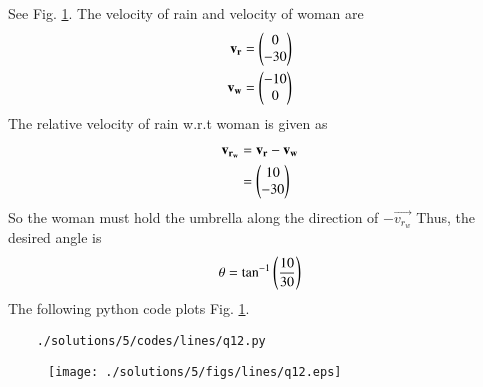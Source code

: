 See Fig. \ref{fig:3.8.5_qtwelve}.	
The velocity of rain and velocity of woman are
\begin{align}
\mathbf{v_r} &= \begin{pmatrix}0\\-30\end{pmatrix}
\\
\mathbf{v_w} &= \begin{pmatrix}-10\\0\end{pmatrix}
\end{align}
The relative velocity of rain w.r.t woman is given as
\begin{align}
\mathbf{v_{r_w}} &=\mathbf{v_r}- \mathbf{v_w}
\\
&=\begin{pmatrix}10\\-30\end{pmatrix}
\end{align}
So the woman must hold the umbrella along the direction of $-\vec{v_{r_w}}$
Thus, the desired angle is 
\begin{align}
\theta={\tan}^{-1}\left(\frac{10}{30}\right)
\end{align}
%
The following python code plots  Fig. \ref{fig:3.8.5_qtwelve}.
	\begin{lstlisting}
	./solutions/5/codes/lines/q12.py
	\end{lstlisting}
\begin{figure}[!ht]
	\centering
	\texttt{[image: ./solutions/5/figs/lines/q12.eps]}
	\caption{}
	\label{fig:3.8.5_qtwelve}	
	\end{figure}
	


